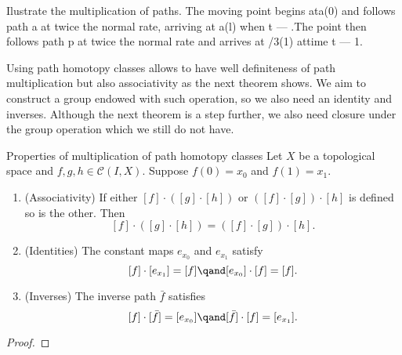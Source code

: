 \begin{example}
    Ilustrate the multiplication of paths.  The moving point begins ata(0) and follows path a at twice the normal rate, arriving at a(l) when t — .The point then follows path p at twice the normal rate and arrives at /3(1) attime t — 1.
\end{example}





Using path homotopy  classes allows to have well definiteness of path multiplication but also  associativity as the next theorem shows. We aim to construct a group endowed with such operation, so we also need an identity and inverses. Although the next theorem is a step further, we also need closure under the group operation which we still do not have.


\begin{theorem}{Properties of multiplication of  path homotopy classes}{}
    Let \(X\) be a topological space and \(f,g,h\in \mathcal{C}(I,X)\). Suppose \(f(0)=x_0\)  and \(f(1) = x_1\).
\begin{enumerate}[label=(\roman*)]
    \item (Associativity) If either \([f]\cdot ([g]\cdot [h])\) or \(([f]\cdot [g])\cdot [h]\) is defined so is the other. Then \[[f]\cdot ([g]\cdot [h]) = ([f]\cdot [g])\cdot [h].\]
    
    \item (Identities) The constant maps \(e_{x_0}\) and \(e_{x_1}\) satisfy \[
        [f]\cdot [e_{x_1}] = [f]\qand [e_{x_0}]\cdot [f] = [f].
    \]
    
    \item (Inverses) The inverse path \(\bar{f}\) satisfies \[
        [f]\cdot [\bar{f}] = [e_{x_0}] \qand [\bar{f}]\cdot [f] = [e_{x_1}].
    \]
\end{enumerate}
\end{theorem}

\begin{proof}
    
\end{proof}


